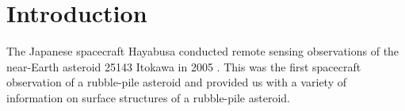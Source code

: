 \documentclass[3p,authoryear]{elsarticle}
\begin{document}
\linenumbers

\section{Introduction}\label{sec:intro}

The Japanese spacecraft Hayabusa conducted remote sensing observations of the near-Earth asteroid 25143 Itokawa in 2005 \citep{fujiwara2006, saito2006}. 
This was the first spacecraft observation of a rubble-pile asteroid and provided us with a variety of information on surface structures of a rubble-pile asteroid.
\end{document}
